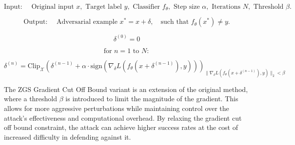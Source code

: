 \[
\text{Input: } \quad \text{Original input } x, \text{ Target label } y, \text{ Classifier } f_\theta, \text{ Step size } \alpha, \text{ Iterations } N, \text{ Threshold } \beta.
\]

\[
\text{Output: } \quad \text{Adversarial example } x^* = x + \delta, \quad \text{such that } f_\theta(x^*) \neq y.
\]

\[
\delta^{(0)} = 0
\]

\[
\text{for } n = 1 \text{ to } N:
\]

\[
\delta^{(n)} = \text{Clip}_{\mathcal{X}} \left( \delta^{(n-1)} + \alpha \cdot \text{sign} \left( \nabla_\delta L(f_\theta(x + \delta^{(n-1)}), y) \right) \right)_{\|\nabla_\delta L(f_\theta(x + \delta^{(n-1)}), y)\|_2 < \beta}
\]

The ZGS Gradient Cut Off Bound variant is an extension of the original method, where a threshold $\beta$ is introduced to limit the magnitude of the gradient. This allows for more aggressive perturbations while maintaining control over the attack's effectiveness and computational overhead. By relaxing the gradient cut off bound constraint, the attack can achieve higher success rates at the cost of increased difficulty in defending against it.